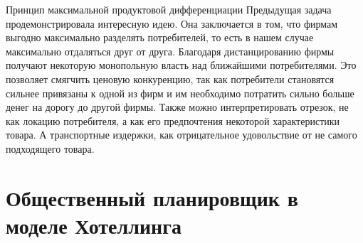 \begin{mybox}{Принцип максимальной продуктовой дифференциации}
    Предыдущая задача продемонстрировала интересную идею. Она заключается в том, что фирмам выгодно максимально
    разделять потребителей, то есть в нашем случае максимально отдаляться друг от друга. Благодаря дистанцированию
    фирмы получают некоторую монопольную власть над ближайшими потребителями. Это позволяет смягчить ценовую
    конкуренцию, так как потребители становятся сильнее привязаны к одной из фирм и им необходимо потратить сильно
    больше денег на дорогу до другой фирмы. Также можно интерпретировать отрезок, не как локацию потребителя, а как
    его предпочтения некоторой характеристики товара. А транспортные издержки, как отрицательное удовольствие от не
    самого подходящего товара.
\end{mybox}


\section{Общественный планировщик в моделе Хотеллинга}


